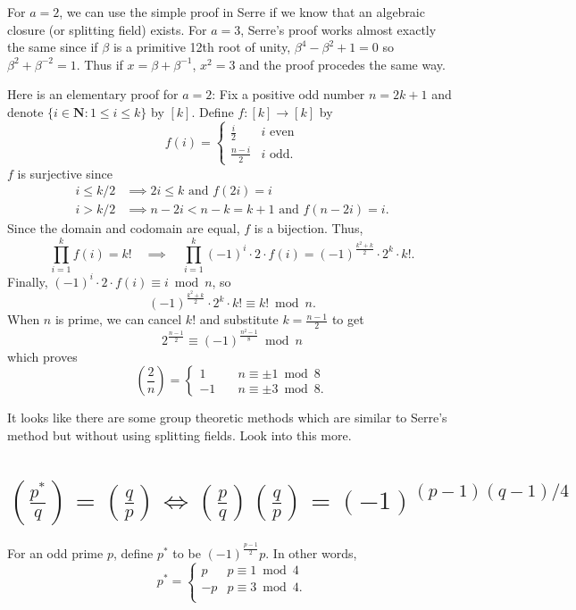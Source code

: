 \documentclass[b5paper,12pt,oneside,openright]{memoir}
\newcommand{\jacobi}[2]{\left(\frac{#1}{#2}\right)}
\begin{document}
For $a=2$, we can use the simple proof in Serre if we know that an algebraic closure (or splitting field) exists. For $a=3$, Serre's proof works almost exactly the same since if $\beta$ is a primitive 12th root of unity, $\beta^4-\beta^2+1=0$ so $\beta^2 + \beta^{-2} = 1$. Thus if $x=\beta + \beta^{-1}$, $x^2 = 3$ and the proof procedes the same way.

Here is an elementary proof for $a=2$: Fix a positive odd number $n = 2k+1$ and denote $\{i\in\mathbf{N} : 1\leq i\leq k\}$ by $[k]$.
Define $f:[k]\to[k]$ by
\[f(i) =
  \begin{cases}
    \frac{i}{2} &i\text{ even}\\
    \frac{n-i}{2} &i\text{ odd}.
  \end{cases}
\]
$f$ is surjective since
\begin{align*}
  i\leq k/2 &\implies 2i\leq k\text{ and }f(2i) = i\\
  i > k/2 &\implies n-2i < n-k = k+1\text{ and }f(n-2i) = i.
\end{align*}
Since the domain and codomain are equal, $f$ is a bijection. Thus,
\[\prod_{i=1}^k f(i) = k!\quad\implies\quad\prod_{i=1}^k (-1)^i\cdot 2\cdot f(i) = (-1)^\frac{k^2 + k}{2}\cdot 2^k\cdot k!.\]
Finally, $(-1)^i\cdot 2\cdot f(i)\equiv i\bmod n$, so
\[(-1)^\frac{k^2 + k}{2}\cdot 2^k\cdot k!\equiv k!\bmod n.\]
When $n$ is prime, we can cancel $k!$ and substitute $k=\frac{n-1}{2}$ to get
\[2^\frac{n-1}{2}\equiv (-1)^\frac{n^2 - 1}{8}\bmod n\]
which proves
\[\left(\frac{2}{n}\right) =
  \begin{cases}
     1 &\quad n\equiv\pm 1\bmod 8\\
    -1 &\quad n\equiv\pm 3\bmod 8.
  \end{cases}
\]

It looks like there are some group theoretic methods which are similar to Serre's method but without using splitting fields. Look into this more.

\section{$\jacobi{p^*}{q}=\jacobi{q}{p}\iff \jacobi{p}{q}\jacobi{q}{p}=(-1)^{(p-1)(q-1)/4}$}

For an odd prime $p$, define $p^*$ to be $(-1)^\frac{p-1}{2} p$. In other words,
\[p^*=
\begin{cases}
  p&p\equiv 1\bmod 4\\
  -p&p\equiv 3\bmod 4.\\
\end{cases}
\]
\end{document}
